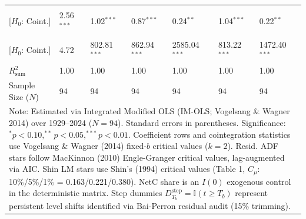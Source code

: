 \begin{table}[H]
\begin{tabular}{p{3.8cm}p{2.1cm}p{2.1cm}p{2.1cm}p{2.1cm}p{2.1cm}p{2.1cm}}
\makecell[l]{Shin LM ($C_{\text{Shin}}$) \\ {\scriptsize [$H_0$: Coint.]}} & 2.56$^{***}$ & 1.02$^{***}$ & 0.87$^{***}$ & 0.24$^{**}$ & 1.04$^{***}$ & 0.22$^{**}$  \\
\makecell[l]{VW Type 2 ($S_{\text{Type 2}}$) \\ {\scriptsize [$H_0$: Coint.]}} & 4.72 & 802.81$^{***}$ & 862.94$^{***}$ & 2585.04$^{***}$ & 813.22$^{***}$ & 1472.40$^{***}$  \\
\midrule
$R^2_{\text{sum}}$ & 1.00 & 1.00 & 1.00 & 1.00 & 1.00 & 1.00  \\
Sample Size ($N$) & 94 & 94 & 94 & 94 & 94 & 94  \\
\bottomrule
\multicolumn{7}{p{16.5cm}}{\footnotesize Note: Estimated via Integrated Modified OLS (IM-OLS; Vogelsang \& Wagner 2014) over 1929--2024 ($N=94$). Standard errors in parentheses. Significance: $^*p<0.10, ^{**}p<0.05, ^{***}p<0.01$. Coefficient rows and cointegration statistics use Vogelsang \& Wagner (2014) fixed-$b$ critical values ($k=2$). Resid. ADF stars follow MacKinnon (2010) Engle-Granger critical values, lag-augmented via AIC. Shin LM stars use Shin's (1994) critical values (Table 1, $C_\mu$: 10\%/5\%/1\% = 0.163/0.221/0.380). NetC share is an $I(0)$ exogenous control in the deterministic matrix. Step dummies $D^{\text{step}}_{T_b} = \mathbb{I}(t \ge T_b)$ represent persistent level shifts identified via Bai-Perron residual audit (15\% trimming).}
\end{tabular}
\end{table}
